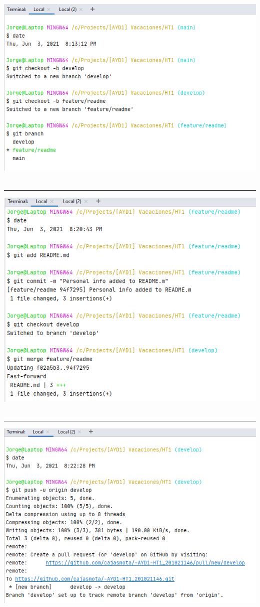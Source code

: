 \documentclass[12pt,letterpaper]{article}
\begin{document}
	\includegraphics{1.PNG} \\\\
	\hrule
	\vspace{1cm}
	\includegraphics{2.PNG} \\\\
	\hrule
	\vspace{1cm}
	\includegraphics{3.PNG} \\\\
\end{document}
